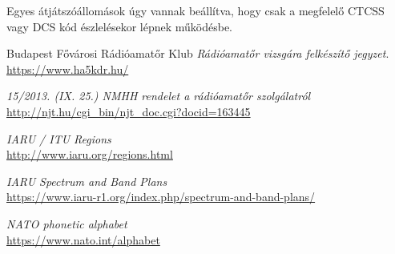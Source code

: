 \documentclass[12pt,a4paper]{article}
\begin{document}
Egyes átjátszóállomások úgy vannak beállítva, hogy csak a megfelelő CTCSS vagy DCS kód észlelésekor lépnek működésbe.
\newpage

\renewcommand{\refname}{Irodalomjegyzék}
\begin{thebibliography}{9}
Budapest Fővárosi Rádióamatőr Klub 
\textit{Rádióamatőr vizsgára felkészítő jegyzet}. 
\\\url{https://www.ha5kdr.hu/}

\textit{15/2013. (IX. 25.) NMHH rendelet a rádióamatőr szolgálatról} 
\\\url{http://njt.hu/cgi_bin/njt_doc.cgi?docid=163445}

\textit{IARU / ITU Regions} 
\\\url{http://www.iaru.org/regions.html}

\textit{IARU Spectrum and Band Plans} 
\\\url{https://www.iaru-r1.org/index.php/spectrum-and-band-plans/}


\textit{NATO phonetic alphabet} 
\\\url{https://www.nato.int/alphabet}

\end{thebibliography}
\end{document}

